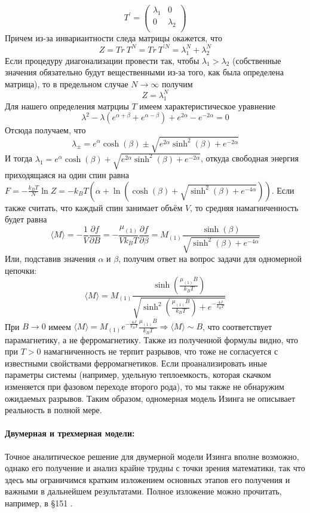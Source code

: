 \documentclass[oneside,final,14pt]{extarticle}
\begin{document}
	$$
	T^\prime=
	\begin{pmatrix}
		\lambda_{1} & 0 \\
		0 & \lambda_{2} \\
	\end{pmatrix}
	$$
	Причем из-за инвариантности следа матрицы окажется, что 
	$$Z=Tr \ T^{N}=Tr \ T^{\prime N}=\lambda_{1}^N+\lambda_{2}^{N}$$
	Если процедуру диагонализации провести так, чтобы $\lambda_{1} > \lambda_{2}$ (собственные значения обязательно будут вещественными из-за того, как была определена матрица), то в предельном случае $N\rightarrow \infty$ получим 
	$$Z=\lambda_1^{N}$$
	Для нашего определения матрциы $T$ имеем характеристическое уравнение 
	$$\lambda^2-\lambda(e^{\alpha+\beta}+e^{\alpha-\beta})+e^{2\alpha}-e^{-2\alpha}=0$$
	Отсюда получаем, что 
	$$\lambda_{\pm}=e^{\alpha}\cosh(\beta)\pm\sqrt{e^{2\alpha}\sinh^{2}(\beta)+e^{-2\alpha}}$$
	И тогда $\lambda_{1}=e^{\alpha}\cosh(\beta)+\sqrt{e^{2\alpha}\sinh^{2}(\beta)+e^{-2\alpha}}$, откуда свободная энергия приходящаяся на один спин равна $F=-\frac{k_{B}T}{N}\ln Z=-k_{B}T\left(\alpha+\ln\left(\cosh(\beta)+\sqrt{\sinh^{2}(\beta)+e^{-4\alpha}}\right)\right)$. Если также считать, что каждый спин занимает объём $V$, то средняя намагниченность будет равна 
	$$\langle M \rangle=-\frac{1}{V}\frac{\partial f}{\partial B}=-\frac{\mu_{(1)}}{Vk_{B}T}\frac{\partial f}{\partial \beta}=M_{(1)}\frac{\sinh(\beta)}{\sqrt{\sinh^2(\beta)+e^{-4\alpha}}}$$
	Или, подставив значения $\alpha$ и $\beta$, получим ответ на вопрос задачи для одномерной цепочки:
	$$\boxed{\langle M \rangle = M_{(1)}\frac{\sinh\left(\frac{\mu_{(1)}B}{k_{B}T}\right)}{\sqrt{\sinh^2\left(\frac{\mu_{(1)}B}{k_{B}T}\right)+e^{-\frac{4J}{k_{B}T}}}}}$$ 
	При $B\rightarrow 0$ имеем $\langle M \rangle=M_{(1)}e^{-\frac{4J}{k_{B}T}}\frac{\mu_{(1)}B}{k_{B}T} \Rightarrow \langle M \rangle \sim B$, что соответствует парамагнетику, а не ферромагнетику. Также из полученной формулы видно, что при $T>0$ намагниченность не терпит разрывов, что тоже не согласуется с известными свойствами ферромагнетиков. Если проанализировать иные параметры системы (например, удельную теплоемкость, которая скачком изменяется при фазовом переходе второго рода), то мы также не обнаружим ожидаемых разрывов. Таким образом, одномерная модель Изинга не описывает реальность в полной мере. 
	\paragraph{Двумерная и трехмерная модели:}
	Точное аналитическое решение для двумерной модели Изинга вполне возможно, однако его получение и анализ крайне трудны с точки зрения математики, так что здесь мы ограничимся кратким изложением основных этапов его получения и важными в дальнейшем результатами. Полное изложение можно прочитать, например, в \S 151 \cite{land5}.
	
\end{document}
